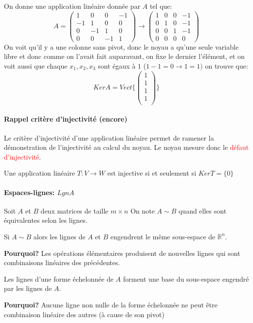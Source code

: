 \begin{exemple}
    On donne une application linéaire donnée par $A$ tel que:
    \[A = \begin{pmatrix}
        1 & 0 & 0 & -1\\
        -1 & 1 & 0 & 0\\
        0 & -1 & 1 & 0 \\
        0 & 0 & -1 & 1
    \end{pmatrix} \to \begin{pmatrix}
         1 & 0 & 0 & -1\\
        0 & 1 & 0 & -1\\
        0 & 0 & 1 & -1 \\
        0 & 0 & 0 & 0
    \end{pmatrix}\]
    On voit qu'il y a une colonne sans pivot, donc le noyau a qu'une seule variable libre et donc comme on l'avait fait auparavant, on fixe le dernier l'élément, et on voit aussi que chaque $x_1, x_2, x_3$ sont égaux à $1$ ($1 -1  = 0 \to 1 = 1)$ on trouve que:
    \[Ker A = Vect\{\begin{pmatrix}
        1 \\ 1 \\1 \\1 \\
    \end{pmatrix}\}\]
    
\end{exemple}

\paragraph{Rappel critère d'injectivité (encore)}
Le critère d'injectivité d'une application linéaire permet de ramener la démonstration de l'injectivité au calcul du noyau. Le noyau mesure donc le \textcolor{red}{défaut d'injectivité}.
\begin{theoreme}
    Une application linéaire $T: V \to W$ est injective si et seulement si $Ker T = \{0\}$ 
\end{theoreme}
\paragraph{Espaces-lignes: $LgnA$}
Soit $A$ et $B$ deux matrices de taille $m\times n$ On note $A  \sim B$ quand elles sont équivalentes selon les lignes.
\begin{theoreme}
    Si $A \sim B$ alors les lignes de $A$ et $B$ engendrent le même sous-espace de $\mathbb{R}^n$.   
\end{theoreme}
\textbf{Pourquoi?} Les opérations élémentaires produisent de nouvelles lignes qui sont combinaisons linéaires des précédentes.
\begin{theoreme}
    Les lignes d'une forme échelonnée de $A$ forment une base du sous-espace engendré par les lignes de $A$.
\end{theoreme}
\textbf{Pourquoi?} Aucune ligne non nulle de la forme échelonnée ne peut être combinaison linéaire des autres (à cause de son pivot)

